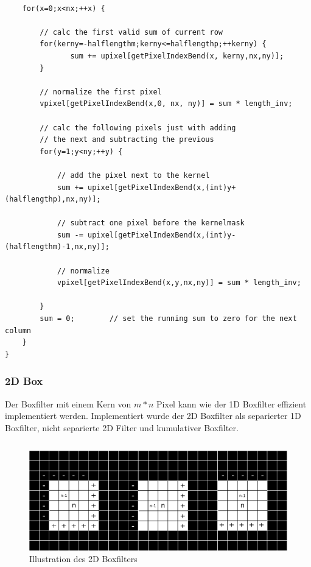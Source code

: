 \documentclass[a4paper,12pt]{article}
\begin{document}
\begin{lstlisting}[float,caption={Codeauschnitt 1D Box}]

	for(x=0;x<nx;++x) {

		// calc the first valid sum of current row
		for(kerny=-halflengthm;kerny<=halflengthp;++kerny) {
			   sum += upixel[getPixelIndexBend(x, kerny,nx,ny)];
		}

		// normalize the first pixel
		vpixel[getPixelIndexBend(x,0, nx, ny)] = sum * length_inv;

		// calc the following pixels just with adding 
		// the next and subtracting the previous
		for(y=1;y<ny;++y) {

			// add the pixel next to the kernel
			sum += upixel[getPixelIndexBend(x,(int)y+(halflengthp),nx,ny)];
				
			// subtract one pixel before the kernelmask
			sum -= upixel[getPixelIndexBend(x,(int)y-(halflengthm)-1,nx,ny)];
			
			// normalize
			vpixel[getPixelIndexBend(x,y,nx,ny)] = sum * length_inv;

		}
		sum = 0;        // set the running sum to zero for the next column
	}
}
\end{lstlisting}
 

\newpage

\subsubsection{2D Box}
Der Boxfilter mit einem Kern von $m \ast n$ Pixel kann wie der 1D Boxfilter
effizient implementiert werden. Implementiert wurde der 2D Boxfilter als
separierter 1D Boxfilter, nicht separierte 2D Filter und kumulativer
Boxfilter.\\



\begin{verbatim}
\end{verbatim}


\begin{figure}[htbp]
\centering
\includegraphics[scale=1.5]{Box2D.png}%
\caption{Illustration des 2D Boxfilters}%
\label{figure_ill_box2d}
\end{figure}
\end{document}
